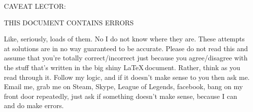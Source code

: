 \documentclass{article}
\begin{document}
\newcommand{\nl}{\mbox{}\\} %
\newcommand{\altx}{\:|\:} %
\newcommand{\alty}{\\[0.1cm]&\:|\:&} %
\newcommand{\minus}{\mbox{-}} %
\newcommand{\term}[1]{\,\mbox{\tt #1}\,} %
\newcommand{\str}{\stackrel{.}{\rightsquigarrow}} %
\newcommand{\sts}{\stackrel{_{*}}{\rightsquigarrow}} %
\newcommand{\nat}{\rightsquigarrow} %
\newcommand{\axm}[4]{\item[{\sc #1 : }]\begin{tabular}{cc}#2\\\hline#3\\\end{tabular}\quad#4}
\newcommand{\sem}[1]{[\![#1]\!]}
\newcommand{\lam}[2]{\lambda {#1} \,.\, #2}
\newcommand{\lfp}[1]{lfp\,(\,#1\,)}
\newcommand{\fix}[1]{fix\,(\,#1\,)}
\newcommand{\hoarep}[3]{\{#1\}\,#2\,\{#3\}}
\newcommand{\hoareP}[3]{\left\{\begin{array}{c}#1\end{array}\right\}\,#2\,\newline\left\{\begin{array}{c}#3\end{array}\right\}}
\newcommand{\hoaret}[3]{[#1]\,#2\,[#3]}
\newcommand{\hoareT}[3]{\left[\begin{array}{c}#1\end{array}\right]\,#2\,\left[\begin{array}{c}#3\end{array}\right]}
\newcommand{\assume}[1]{$\blacklozenge$ #1}
\newcommand{\st}{\,\; st \,\;}
\newcommand{\pr}{\mathbb{P}}

\begin{center}
	\Huge{CAVEAT LECTOR:}
\end{center}
\begin{center}
	\Large{THIS DOCUMENT CONTAINS ERRORS}
\end{center}

Like, seriously, loads of them. No I do not know where they are. These attempts at solutions are in no way guaranteed to be accurate. Please do not read this and assume that you're totally correct/incorrect just because you agree/disagree with the stuff that's written in the big shiny \LaTeX \,document. Rather, think as you read through it. Follow my logic, and if it doesn't make sense to you then ask me. Email me\footnotemark[1], grab me on Steam, Skype, League of Legends\footnotemark[2], facebook, bang on my front door repeatedly\footnotemark[3], just ask if something doesn't make sense, because I can and do make errors.
\end{document}
